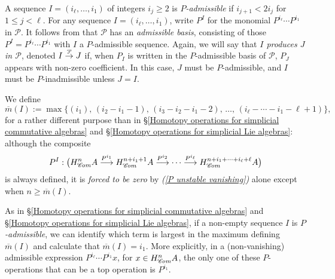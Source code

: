 \documentclass[11pt]{amsart} \renewcommand{\baselinestretch}{1.2}
\theoremstyle{plain}
\newtheorem{lem}[thm]{Lemma}
\numberwithin{equation}{section} %
\theoremstyle{plain}
\newtheorem{lem}[thm]{Lemma}
\numberwithin{equation}{chapter} %
\renewcommand{\to}{\longrightarrow}
\newcommand{\scrC}{\mathscr{C}}
\newcommand{\calP}{\mathcal{P}}
\newcommand{\Palg}{{\calP}}
\newcommand{\minDimP}{\overline{m}}
\newcommand{\minDimDelta}{m}
\newcommand{\produces}[3]{#3:#1\sim #2}
\renewcommand{\produces}[3]{#1\rightarrow_{#3} #2}%
\renewcommand{\produces}[3]{#1\overset{\smash{#3}}{\rightarrow} #2}%
\newcommand{\algs}{{\scrC\!\textit{\normalfont\textit{om}}}}
\begin{document}
\begin{Constructing cohomology operations}
A sequence $I=(i_\ell,\ldots,i_1)$ of integers $i_j\geq2$ is \emph{$P$-admissible} if $i_{j+1}<2i_j$ for $1\leq j <\ell$. For any sequence $I=(i_\ell,\ldots,i_1)$, write $P^I$ for the monomial $P^{i_\ell}\cdots P^{i_1}$ in $\Palg$. It follows from \cite[Theorem I]{MR1089001} that $\Palg$ has an \emph{admissible basis}, consisting of those $P^I=P^{i_\ell}\cdots P^{i_{1}}$ with $I$ a $P$-admissible sequence.  Again, we will say that \emph{$I$ produces $J$ in $\Palg$}, denoted $\produces{I}{J}{\Palg}$ if, when $P_I$ is written in the $P$-admissible basis of $\Palg$, $P_J$ appears with non-zero coefficient. In this case, $J$ must be $P$-admissible, and $I$ must be $P$-inadmissible unless $J=I$.

We define
\[\minDimP(I):=\max\{(i_1),\,(i_2-i_1-1),\,(i_3-i_2-i_1-2),\,\ldots,\,(i_{\ell}-\cdots-i_1-\ell+1)\},\]
for a rather different purpose than in \S\ref{Homotopy operations for simplicial commutative algebras} and \S\ref{Homotopy operations for simplicial Lie algebras}: although the composite 
\[P^I:\bigl(H_{\algs}^{n}A\overset{P^{i_1}}{\to}H_{\algs}^{n+i_1+1}A\overset{P^{i_2}}{\to}\cdots \overset{P^{i_\ell}}{\to}H_{\algs}^{n+i_1+\cdots +i_\ell+\ell}A\bigr)\]
is always defined, it is \emph{forced to be zero} by \emph{(\ref{P unstable vanishing})} alone except  when $n\geq\minDimP(I)$.

As in \S\ref{Homotopy operations for simplicial commutative algebras} and \S\ref{Homotopy operations for simplicial Lie algebras}, if a non-empty sequence $I$  is \emph{$P$-admissible}, we can identify which term is largest in the maximum defining $\minDimP(I)$ and calculate that $\minDimP(I)=i_1$. More explicitly, in a (non-vanishing) admissible expression $P^{i_\ell}\cdots P^{i_1}x$, for $x\in H^n_{\algs}A$, the only one of these $P$-operations that can be a top operation is $P^{i_{1}}$.




\end{Constructing cohomology operations}
\end{document}
